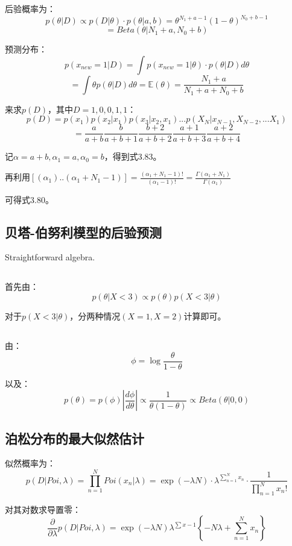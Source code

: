 \documentclass[UTF8]{ctexart}
\begin{document}
后验概率为：
$$p(\theta|D) \propto p(D|\theta)\cdot p(\theta|a,b)=\theta^{N_{1}+a-1}(1-\theta)^{N_{0}+b-1}$$
$$=Beta(\theta|N_{1}+a,N_{0}+b)$$

预测分布：
$$p(x_{new}=1|D)=\int p(x_{new}=1|\theta)\cdot p(\theta|D) d\theta$$
$$=\int \theta p(\theta|D) d\theta = \mathbb{E}(\theta) = \frac{N_{1}+a}{N_{1}+a+N_{0}+b}$$

来求$p(D)$，其中$D=1,0,0,1,1$：
$$p(D)=p(x_{1})p(x_{2}|x_{1})p(x_{3}|x_{2},x_{1})...p(X_{N}|x_{N-1},X_{N-2},...X_{1})$$
$$=\frac{a}{a+b}\frac{b}{a+b+1}\frac{b+2}{a+b+2}\frac{a+1}{a+b+3}\frac{a+2}{a+b+4}$$

记$\alpha=a+b,\alpha_{1}=a,\alpha_{0}=b$，得到式3.83。

再利用$[(\alpha_{1})..(\alpha_{1}+N_{1}-1)] = \frac{(\alpha_{1}+N_{1}-1)!}{(\alpha_{1}-1)!}=\frac{\Gamma(\alpha_{1}+N_{1})}{\Gamma(\alpha_{1})}$

可得式3.80。

\subsection{贝塔-伯努利模型的后验预测}
Straightforward algebra.

\subsection{}
首先由：
$$p(\theta|X<3)\propto p(\theta)p(X<3|\theta)$$

对于$p(X<3|\theta)$，分两种情况$(X=1,X=2)$计算即可。 

\subsection{}
由：
$$\phi=\log \frac{\theta}{1-\theta}$$

以及：
$$p(\theta)=p(\phi)|\frac{d\phi}{d\theta}| \propto \frac{1}{\theta(1-\theta)} \propto Beta(\theta|0,0)$$

\subsection{泊松分布的最大似然估计}
似然概率为：
$$p(D|Poi,\lambda)=\prod_{n=1}^{N}Poi(x_{n}|\lambda) = \exp(-\lambda N)\cdot \lambda^{\sum_{n=1}^{N}x_{n}}\cdot\frac{1}{\prod_{n=1}^{N}x_{n}!}$$

对其对数求导置零：
$$\frac{\partial}{\partial \lambda}p(D|Poi,\lambda) = \exp(-\lambda N)\lambda^{\sum x- 1}\left\{ -N\lambda + \sum_{n=1}^{N}x_{n} \right\}$$
\end{document}
